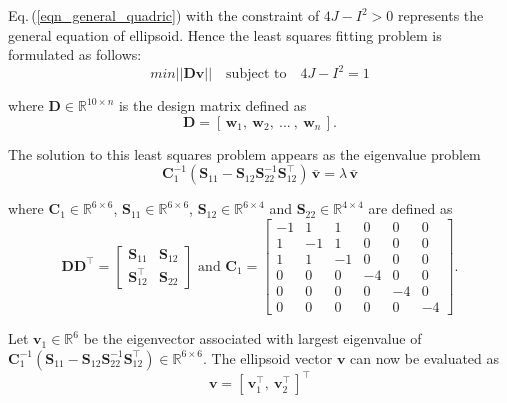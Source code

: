 \documentclass[10pt, a4paper]{article}
\begin{document}
Eq.\,(\ref{eqn_general_quadric}) with the constraint of $4J - I ^{2}> 0$ represents the general equation of ellipsoid. Hence the least squares fitting problem is formulated as follows:
\begin{equation} \label{eqn_ellipsoid_problem}
min|\!| \bm{D}\bm{v} |\!| \quad \text{subject to} \quad 4J - I^{2} = 1 
\end{equation}

where $\bm{D} \in \mathbb{R}^{10\times n}$ is the design matrix defined as 
\begin{equation} \label{eqn_design_matrix}
\bm{D} = [\,\bm{w}_{1},\: \bm{w}_{2},\: ... \:,\: \bm{w}_{n}\,].
\end{equation}

The solution to this least squares problem appears as the eigenvalue problem
\begin{equation}
\bm{C}_{1}^{-1}(\bm{S}_{11}-\bm{S}_{12}\bm{S}_{22}^{-1}\bm{S}_{12}^{\intercal}) \, \bar{\bm{v}} = \lambda \, \bar{\bm{v}}
\end{equation}

where $\bm{C}_{1} \in \mathbb{R}^{6\times6}$, $\bm{S}_{11} \in \mathbb{R}^{6\times6}$, $\bm{S}_{12} \in \mathbb{R}^{6\times4}$ and $\bm{S}_{22} \in \mathbb{R}^{4\times4}$ are defined as
\begin{equation}\label{eqn_SandC}
\bm{D}\bm{D}^{\intercal} = \begin{bmatrix} \bm{S}_{11} & \bm{S}_{12} \\\bm{S}_{12}^{\intercal} & \bm{S}_{22}\end{bmatrix} \text{ and }
\bm{C}_{1} = 
\begin{bmatrix}
-1&1&1&0&0&0 \\ 1&-1&1&0&0&0 \\ 1&1&-1&0&0&0\\ 0&0&0&-4&0&0 \\ 0&0&0&0&-4&0\\ 0&0&0&0&0&-4
\end{bmatrix}.
\end{equation}

Let $\bm{v}_{1} \in \mathbb{R}^{6}$ be the eigenvector associated with largest eigenvalue of $\bm{C}_{1}^{-1}(\bm{S}_{11}-\bm{S}_{12}\bm{S}_{22}^{-1}\bm{S}_{12}^{\intercal}) \in \mathbb{R}^{6\times6}$. The ellipsoid vector $\bm{v}$ can now be evaluated as
\begin{equation}\label{eqn_ellipsoid_soln}
\bm{v} = [\,\bm{v}_{1}^{\intercal},
\: \bm{v}_{2}^{\intercal}\,]^{\intercal}
\end{equation}
\end{document}
